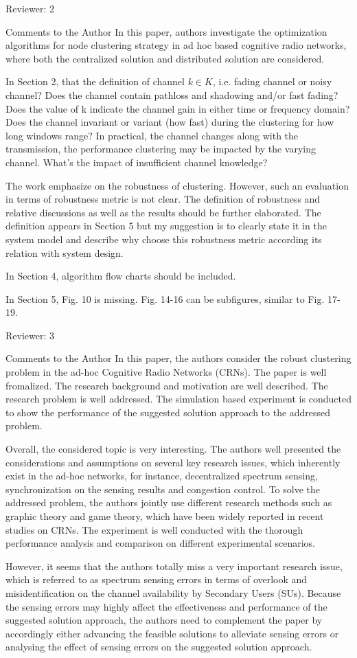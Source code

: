 \documentclass[10pt,a4paper]{article}
\begin{document}
Reviewer: 2

Comments to the Author
In this paper, authors investigate the optimization algorithms for node clustering strategy in ad hoc based cognitive radio networks, where both the centralized solution and distributed solution are considered.

In Section 2, that the definition of channel $k\in K$, i.e. fading channel or noisy channel? Does the channel contain pathloss and shadowing and/or fast fading? Does the value of k indicate the channel gain in either time or frequency domain? Does the channel invariant or variant (how fast) during the clustering for how long windows range? In practical, the channel changes along with the transmission, the performance clustering may be impacted by the varying channel. What's the impact of insufficient channel knowledge?

The work emphasize on the robustness of clustering. However, such an evaluation in terms of robustness metric is not clear. The definition of robustness and relative discussions as well as the results should be further elaborated. The definition appears in Section 5 but my suggestion is to clearly state it in the system model and describe why choose this robustness metric according its relation with system design.

In Section 4, algorithm flow charts should be included.

In Section 5, Fig. 10 is missing. Fig. 14-16 can be subfigures, similar to Fig. 17-19.


Reviewer: 3

Comments to the Author
In this paper, the authors consider the robust clustering problem in the ad-hoc Cognitive Radio Networks (CRNs). The paper is well fromalized. The research background and motivation are well described. The research problem is well addressed. The simulation based experiment is conducted to show the performance of the suggested solution approach to the addressed problem.

Overall, the considered topic is very interesting. The authors well presented the considerations and assumptions on several key research issues, which inherently exist in the ad-hoc networks, for instance, decentralized spectrum sensing, synchronization on the sensing results and congestion control. To solve the addressed problem, the authors jointly use different research methods such as graphic theory and game theory, which have been widely reported in recent studies on CRNs. The experiment is well conducted with the thorough performance analysis and comparison on different experimental scenarios.

However, it seems that the authors totally miss a very important research issue, which is referred to as spectrum sensing errors in terms of overlook and misidentification on the channel availability by Secondary Users (SUs). Because the sensing errors may highly affect the effectiveness and performance of the suggested solution approach, the authors need to complement the paper by accordingly either advancing the feasible solutions to alleviate sensing errors or analysing the effect of sensing errors on the suggested solution approach.


%


\end{document}
